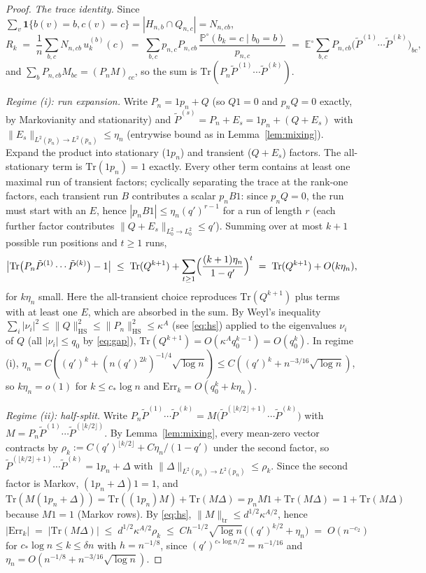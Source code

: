 \documentclass[11pt]{article}
\newcommand{\E}{\mathbb{E}}
\newcommand{\Prob}{\mathbb{P}}
\newcommand{\1}{\mathbf{1}}
\newcommand{\Tr}{\mathrm{Tr}}
\newcommand{\Err}{\mathrm{Err}}
\theoremstyle{remark}
\begin{document}
\begin{proof}
\emph{The trace identity.} Since
$\sum_v\1\{b(v)=b,c(v)=c\}=|H_{n,b}\cap Q_{n,c}|=N_{n,cb}$,
\[
R_k\;=\;\frac1n\sum_{b,c}N_{n,cb}\,u_k^{(b)}(c)
\;=\;\sum_{b,c}p_{n,c}P_{n,cb}\,\frac{\Prob^\circ(b_k=c\mid b_0=b)}{p_{n,c}}
\;=\;\E^\circ\sum_{b,c}P_{n,cb}\bigl(\tilde P^{(1)}\cdots\tilde
P^{(k)}\bigr)_{bc},
\]
and $\sum_bP_{n,cb}M_{bc}=(P_nM)_{cc}$, so the sum is
$\Tr(P_n\tilde P^{(1)}\cdots\tilde P^{(k)})$.

\emph{Regime (i): run expansion.} Write $P_n=1p_n+Q$ (so $Q1=0$ and
$p_nQ=0$ exactly, by Markovianity and stationarity) and
$\tilde P^{(s)}=P_n+E_s=1p_n+(Q+E_s)$ with $\|E_s\|_{L^2(p_n)\to L^2(p_n)}
\le\eta_n$ (entrywise bound as in Lemma~\ref{lem:mixing}). Expand the
product into stationary ($1p_n$) and transient ($Q+E_s$) factors. The
all-stationary term is $\Tr(1p_n)=1$ exactly. Every other term contains at
least one maximal run of transient factors; cyclically separating the trace
at the rank-one factors, each transient run $B$ contributes a scalar
$p_nB1$: since $p_nQ=0$, the run must start with an $E$, hence
$|p_nB1|\le\eta_n(q')^{r-1}$ for a run of length $r$ (each further factor
contributes $\|Q+E_s\|_{L^2_0\to L^2_0}\le q'$). Summing over at most
$k+1$ possible run positions and $t\ge1$ runs,
\[
\bigl|\Tr\bigl(P_n\tilde P^{(1)}\cdots\tilde P^{(k)}\bigr)-1\bigr|
\;\le\;\Tr(Q^{k+1})+\sum_{t\ge1}
\Bigl(\frac{(k+1)\eta_n}{1-q'}\Bigr)^t
\;=\;\Tr(Q^{k+1})+O(k\eta_n),
\]
for $k\eta_n$ small. Here the all-transient choice reproduces
$\Tr(Q^{k+1})$ plus terms with at least one $E$, which are absorbed in the
sum. By Weyl's inequality $\sum_i|\nu_i|^2\le\|Q\|_{\mathrm{HS}}^2
\le\|P_n\|_{\mathrm{HS}}^2\le\kappa^A$ (see \eqref{eq:hs}) applied to the
eigenvalues $\nu_i$ of $Q$ (all $|\nu_i|\le q_0$ by \eqref{eq:gap}),
$\Tr(Q^{k+1})=O(\kappa^Aq_0^{k-1})=O(q_0^k)$. In regime (i),
$\eta_n=C((q')^k+(n(q')^{2k})^{-1/4}\sqrt{\log n})
\le C((q')^k+n^{-3/16}\sqrt{\log n})$, so
$k\eta_n=o(1)$ for $k\le c_*\log n$ and $\Err_k=O(q_0^k+k\eta_n)$.

\emph{Regime (ii): half-split.} Write
$P_n\tilde P^{(1)}\cdots\tilde P^{(k)}
=M\bigl(\tilde P^{(\lfloor k/2\rfloor+1)}\cdots\tilde P^{(k)}\bigr)$ with
$M=P_n\tilde P^{(1)}\cdots\tilde P^{(\lfloor k/2\rfloor)}$. By
Lemma~\ref{lem:mixing}, every mean-zero vector contracts by
$\rho_k:=C(q')^{\lfloor k/2\rfloor}+C\eta_n/(1-q')$ under the second
factor, so $\tilde P^{(\lfloor k/2\rfloor+1)}\cdots\tilde P^{(k)}
=1p_n+\Delta$ with $\|\Delta\|_{L^2(p_n)\to L^2(p_n)}\le\rho_k$. Since the
second factor is Markov, $(1p_n+\Delta)1=1$, and
$\Tr(M(1p_n+\Delta))=\Tr((1p_n)M)+\Tr(M\Delta)=p_nM1+\Tr(M\Delta)
=1+\Tr(M\Delta)$ because $M1=1$ (Markov rows). By \eqref{eq:hs},
$\|M\|_{\mathrm{tr}}\le d^{1/2}\kappa^{A/2}$, hence
\[
|\Err_k|\;=\;|\Tr(M\Delta)|\;\le\;d^{1/2}\kappa^{A/2}\rho_k
\;\le\;C h^{-1/2}\sqrt{\log n}\,\bigl((q')^{k/2}+\eta_n\bigr)
\;=\;O(n^{-c_2})
\]
for $c_*\log n\le k\le\delta n$ with $h=n^{-1/8}$, since
$(q')^{c_*\log n/2}=n^{-1/16}$ and
$\eta_n=O(n^{-1/8}+n^{-3/16}\sqrt{\log n})$.
\end{proof}
\end{document}
